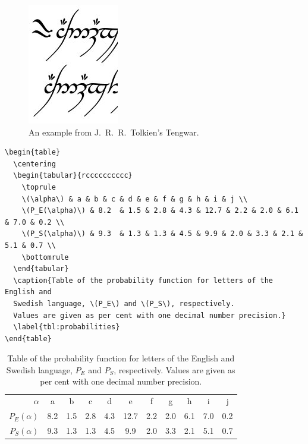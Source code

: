 \begin{frame}
	\begin{figure}
		\centering
    \includegraphics[width=0.2\linewidth]{figs/tengwar.jpg}
    \caption{An example from J.~R.~R.~Tolkien's Tengwar.}
    \label{fig:bild}
	\end{figure}
\end{frame}

\begin{frame}
	\begin{lstlisting}
\begin{table}
  \centering
  \begin{tabular}{rcccccccccc}
    \toprule
    \(\alpha\) & a & b & c & d & e & f & g & h & i & j \\
    \(P_E(\alpha)\) & 8.2  & 1.5 & 2.8 & 4.3 & 12.7 & 2.2 & 2.0 & 6.1 & 7.0 & 0.2 \\
    \(P_S(\alpha)\) & 9.3  & 1.3 & 1.3 & 4.5 & 9.9 & 2.0 & 3.3 & 2.1 & 5.1 & 0.7 \\
    \bottomrule
  \end{tabular}
  \caption{Table of the probability function for letters of the English and 
  Swedish language, \(P_E\) and \(P_S\), respectively.
  Values are given as per cent with one decimal number precision.}
  \label{tbl:probabilities}
\end{table}
	\end{lstlisting}
\end{frame}

\begin{frame}
\begin{table}
  \centering
  \begin{tabular}{rcccccccccc}
    \toprule
    \(\alpha\) & a & b & c & d & e & f & g & h & i & j \\
    \(P_E(\alpha)\) & 8.2  & 1.5 & 2.8 & 4.3 & 12.7 & 2.2 & 2.0 & 6.1 & 7.0 & 0.2 \\
    \(P_S(\alpha)\) & 9.3  & 1.3 & 1.3 & 4.5 & 9.9 & 2.0 & 3.3 & 2.1 & 5.1 & 0.7 \\
    \bottomrule
  \end{tabular}
  \caption{Table of the probability function for letters of the English and 
  Swedish language, \(P_E\) and \(P_S\), respectively.
  Values are given as per cent with one decimal number precision.}
  \label{tbl:probabilities}
\end{table}
\end{frame}



